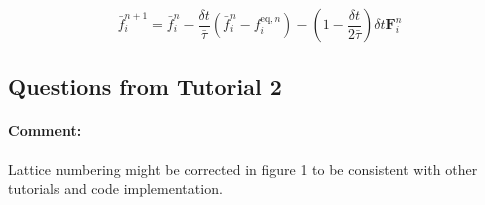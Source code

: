 \documentclass{article}
\begin{document}
	\begin{equation}
	\bar{f}^{n+1}_i  = \bar{f}^{n}_i  - \frac{\delta t}{\bar{\tau}} (\bar{f}^{n}_i - f^{\text{eq},n}_i) - \left( 1 - \frac{\delta t}{2 \bar{{\tau}}} \right)   \delta t \mathbf{F}^n_i 
	\end{equation}
	
	\subsection{Questions from Tutorial 2}
	\paragraph{Comment:} Lattice numbering might be corrected in figure 1 to be consistent with other tutorials and code implementation.
	
\end{document}
